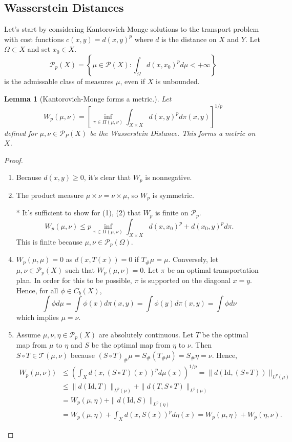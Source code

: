 \documentclass[12pt]{article}
\theoremstyle{plain}
\newtheorem{lem}{Lemma}[section]
\numberwithin{equation}{section}
\begin{document}
\subsection{Wasserstein Distances}
Let's start by considering Kantorovich-Monge solutions to the transport problem with cost functions $c(x,y) = d(x,y)^p$ where $d$ is the distance on $X$ and $Y$.
Let $\Omega\subset X$ and set $x_0\in X$.
\[\mathcal{P}_p(X) = \left\{\mu\in\mathcal{P}(X):\int_{\Omega}d(x,x_0)^pd\mu < +\infty\right\}\]
is the admissable class of measures $\mu$, even if $X$ is unbounded.
\begin{lem}[Kantorovich-Monge forms a metric.]\label{lem:wass}
	Let \[W_p(\mu,\nu) = \left[\inf_{\pi\in\Pi(\mu,\nu)}\int_{X\times X}d(x,y)^pd\pi(x,y)\right]^{1/p}\] defined for $\mu,\nu\in\mathcal{P}_P(X)$ be the Wasserstein Distance. This forms a metric on $X$.
\end{lem}
\begin{proof}
  \begin{enumerate}
    \item Because $d(x,y) \ge 0$, it's clear that $W_p$ is nonnegative. 
    \item The product measure $\mu\times \nu = \nu\times \mu$, so $W_p$ is symmetric.
    \item[*] It's sufficient to show for (1), (2) that $W_p$ is finite on $\mathcal{P}_p$.
    \begin{equation*}W_p(\mu,\nu) \le p\inf_{\pi\in\Pi(\mu,\nu)}\int_{X\times X}d(x,x_0)^p + d(x_0,y)^pd\pi.\end{equation*}
    This is finite because $\mu,\nu\in \mathcal{P}_p(\Omega)$.
    \item  $W_p(\mu,\mu) = 0$ as $d(x,T(x)) = 0$ if $T_\# \mu = \mu$. Conversely, let $\mu,\nu\in \mathcal{P}_p(X)$ such that $W_p(\mu,\nu) = 0$. Let $\pi$ be an optimal transportation plan. 
    In order for this to be possible, $\pi$ is supported on the diagonal $x=y$. Hence, for all $\phi\in C_b(X)$,
    \[ \int \phi d\mu = \int \phi(x)d\pi(x,y) = \int\phi(y)d\pi(x,y) = \int\phi d\nu\]
    which implies $\mu=\nu$.
    \item   Assume $\mu,\nu,\eta\in \mathcal{P}_p(X)$ are absolutely continuous. Let $T$ be the optimal map from $\mu$ to $\eta$ and $S$ be the optimal map from $\eta$ to $\nu$.
    Then $S\circ T\in \mathcal{T}(\mu,\nu)$ because $(S\circ T)_\#\mu = S_\#(T_\#\mu) = S_\#\eta = \nu$. Hence,
    \begin{align*}
      W_p(\mu,\nu)) &\le \left(\int_Xd(x,(S\circ T)(x))^pd\mu(x)\right)^{1/p} = \|d(\text{Id},(S\circ T))\|_{L^p(\mu)} \\
      &\le \|d(\text{Id},T)\|_{L^p(\mu)} + \|d(T, S\circ T)\|_{L^p(\mu)} \\
      &= W_p(\mu,\eta) + \|d(\text{Id}, S)\|_{L^p(\eta)} \\
      &= W_p(\mu,\eta) + \int_{X}d(x,S(x))^pd\eta(x) = W_p(\mu,\eta) + W_p(\eta,\nu).
      \end{align*}
  \end{enumerate}
\end{proof}
\end{document}
